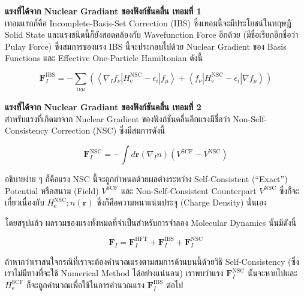 \noindent \textbf{แรงที่ได้จาก Nuclear Gradiant ของฟังก์ชันคลื่น เทอมที่ 1} \\
เทอมแรกก็คือ Incomplete-Basis-Set Correction (IBS) ซึ่งเทอมนี้จะมีประโยชน์ในทฤษฎี Solid State และแรงชนิดนี้ก็ยังสอดคล้องกับ
Wavefunction Force อีกด้วย (มีชื่อเรียกอีกชื่อว่า Pulay Force) ซึ่งสมการของแรง IBS นี้จะประกอบไปด้วย Nuclear Gradient ของ
Basis Functions และ Effective One-Particle Hamiltonian ดังนี้

\begin{equation}
  \mathbf{F}_I^{\mathrm{IBS}}
  =
  - \sum_{i \nu \mu}\left(\left\langle\nabla_I f_\nu\left| H_{\mathrm{e}}^{\mathrm{NSC}}-\epsilon_i\right| f_\mu\right\rangle
  + \left\langle f_\nu\left| H_{\mathrm{e}}^{\mathrm{NSC}}-\epsilon_i\right| \nabla f_\mu\right\rangle\right)
\end{equation}

\noindent \textbf{แรงที่ได้จาก Nuclear Gradiant ของฟังก์ชันคลื่น เทอมที่ 2} \\
สำหรับแรงที่เกิดมาจาก Nuclear Gradient ของฟังก์ชันคลื่นอีกแรงมีชื่อว่า Non-Self-Consistency Correction (NSC) ซึ่งมีสมการดังนี้

\begin{equation}
  \mathbf{F}_I^{\mathrm{NSC}}
  =
  - \int d \mathbf{r}\left(\nabla_I n\right)\left(V^{\mathrm{SCF}}-V^{\mathrm{NSC}}\right)
\end{equation}

\noindent อธิบายง่าย ๆ ก็คือแรง NSC นี้จะถูกกำหนดด้วยผลต่างระหว่าง Self-Consistent (\enquote{Exact}) Potential หรือสนาม
(Field) $V^{\mathrm{SCF}}$ และ Non-Self-Consistent Counterpart $V^{\mathrm{NSC}}$ ซึ่งก็จะเกี่ยวเนื่องกับ
$H_{\mathrm{e}}^{\mathrm{NSC}} ; n(\mathbf{r})$ ซึ่งก็คือความหนาแน่นประจุ (Charge Density) นั่นเอง

โดยสรุปแล้ว ผลรวมของแรงทั้งหมดที่จำเป็นสำหรับการจำลอง  Molecular Dynamics นั้นมีดังนี้

\begin{equation}
  \mathbf{F}_I
  =
  \mathbf{F}_I^{\mathrm{HFT}}
  + \mathbf{F}_I^{\mathrm{IBS}}
  + \mathbf{F}_I^{\mathrm{NSC}}
\end{equation}

\noindent ถ้าหากว่าเราสนใจกรณีที่เราจะต้องคำนวณแรงตามสมการด้านบนนี้ด้วยวิธี Self-Consistency (ซึ่งเราไม่มีทางที่จะใช้ Numerical
Method ได้อย่างแน่นอน) เราพบว่าแรง $\mathbf{F}_I^{\mathrm{NSC}}$ นั้นจะหายไปและ $ H_{\mathrm{e}}^{\mathrm{SCF}}$
ก็จะถูกคำนวณเพื่อใช้ในการคำนวณแรง $\mathbf{F}_I^{\mathrm{IBS}}$ ต่อไป


